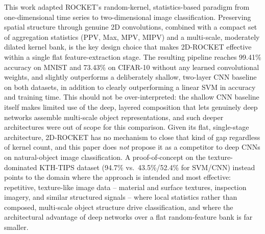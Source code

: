 \documentclass[a4paper,fleqn]{cas-sc}
\begin{document}
This work adapted ROCKET's random-kernel, statistics-based paradigm from one-dimensional time series to two-dimensional image classification. Preserving spatial structure through genuine 2D convolutions, combined with a compact set of aggregation statistics (PPV, Max, MPV, MIPV) and a multi-scale, moderately dilated kernel bank, is the key design choice that makes 2D-ROCKET effective within a single flat feature-extraction stage. The resulting pipeline reaches 99.41\% accuracy on MNIST and 73.43\% on CIFAR-10 without any learned convolutional weights, and slightly outperforms a deliberately shallow, two-layer CNN baseline on both datasets, in addition to clearly outperforming a linear SVM in accuracy and training time. This should not be over-interpreted: the shallow CNN baseline itself makes limited use of the deep, layered composition that lets genuinely deep networks assemble multi-scale object representations, and such deeper architectures were out of scope for this comparison. Given its flat, single-stage architecture, 2D-ROCKET has no mechanism to close that kind of gap regardless of kernel count, and this paper does \emph{not} propose it as a competitor to deep CNNs on natural-object image classification. A proof-of-concept on the texture-dominated KTH-TIPS dataset (94.7\% vs.\ 43.5\%/52.4\% for SVM/CNN) instead points to the domain where the approach is intended and most effective: repetitive, texture-like image data -- material and surface textures, inspection imagery, and similar structured signals -- where local statistics rather than composed, multi-scale object structure drive classification, and where the architectural advantage of deep networks over a flat random-feature bank is far smaller.
\end{document}
